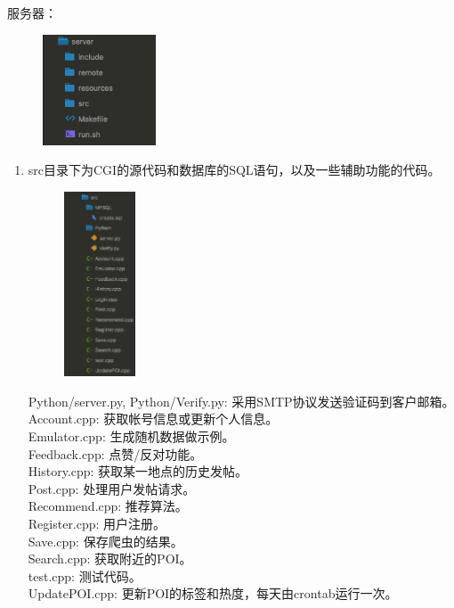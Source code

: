 \documentclass[UTF8]{article}
\begin{document}
服务器：
\begin{figure}[H]
    \center
    \includegraphics[width=0.3\textwidth]{images/server1.png}
\end{figure}
\begin{enumerate}
    \item src目录下为CGI的源代码和数据库的SQL语句，以及一些辅助功能的代码。\\
    \begin{figure}[H]
    \center
    \includegraphics[width=0.2\textwidth]{images/server3.png}
    \end{figure}
    \begin{tcolorbox}[colback=white]
        Python/server.py, Python/Verify.py: 采用SMTP协议发送验证码到客户邮箱。\\
        Account.cpp: 获取帐号信息或更新个人信息。\\
        Emulator.cpp: 生成随机数据做示例。\\
        Feedback.cpp: 点赞/反对功能。\\
        History.cpp: 获取某一地点的历史发帖。\\
        Post.cpp: 处理用户发帖请求。\\
        Recommend.cpp: 推荐算法。\\
        Register.cpp: 用户注册。\\
        Save.cpp: 保存爬虫的结果。\\
        Search.cpp: 获取附近的POI。\\
        test.cpp: 测试代码。\\
        UpdatePOI.cpp: 更新POI的标签和热度，每天由crontab运行一次。
    \end{tcolorbox}


\end{enumerate}
\end{document}
